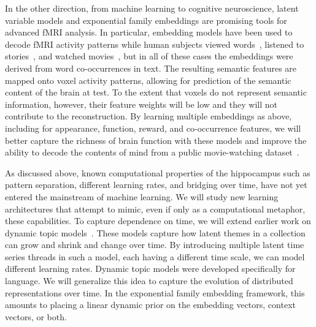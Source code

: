 In the other direction, from machine learning to cognitive neuroscience,
latent variable models and exponential family embeddings
are promising tools for advanced fMRI analysis. In particular,
embedding models have been used to decode fMRI activity patterns while
human subjects viewed words~\citep{Mitchell:2008}, listened to
stories~\citep{Huth:2016}, and watched movies~\citep{Vodrahalli:2017},
but in all of these cases the embeddings were derived from word
co-occurrences in text. The resulting semantic features are mapped onto
voxel activity patterns, allowing for prediction of the semantic content
of the brain at test. To the extent that voxels do not
represent semantic information, however, their feature weights will
be low and they will not contribute to the reconstruction. By learning
multiple embeddings as above, including for appearance, function, reward, and co-occurrence features, we will better capture the richness
of brain function with these models and improve the ability to decode
the contents of mind from a public movie-watching dataset~\citep[as used
in][]{Vodrahalli:2017}.

As discussed above, known computational properties of the hippocampus
such as pattern separation, different learning rates, and bridging
over time, have not yet entered the mainstream of machine learning.
We will study new learning architectures that attempt to mimic, even
if only as a computational metaphor, these capabilities.
To capture dependence on time, we will extend earlier work on dynamic topic
models~\citep{Blei:2006d}. These models capture how
latent themes in a collection can grow and shrink and change over
time. By introducing multiple latent time series threads in such a
model, each having a different time scale, we can model different
learning rates. Dynamic topic models were
developed specifically for language.  We will generalize this idea to
capture the evolution of distributed representations over time. In
the exponential family embedding framework, this amounts to placing a
linear dynamic prior on the embedding vectors, context vectors,
or both.
